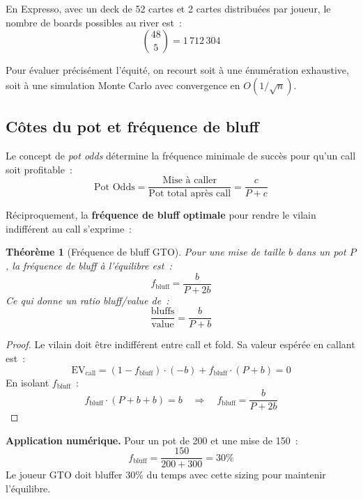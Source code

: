 \documentclass[a4paper,11pt]{article}
\newtheorem{theoreme}{Th\'eor\`eme}[section]
\newcommand{\EV}{\mathrm{EV}}
\begin{document}
En Expresso, avec un deck de 52 cartes et 2 cartes distribu\'ees par joueur, le nombre de boards possibles au river est~:
\begin{equation}
\binom{48}{5} = 1\,712\,304
\end{equation}

Pour \'evaluer pr\'ecis\'ement l'\'equit\'e, on recourt soit \`a une \'enum\'eration exhaustive, soit \`a une simulation Monte Carlo avec convergence en $O(1/\sqrt{n})$.

\subsection{C\^otes du pot et fr\'equence de bluff}

Le concept de \textit{pot odds} d\'etermine la fr\'equence minimale de succ\`es pour qu'un call soit profitable~:
\begin{equation}
\text{Pot Odds} = \frac{\text{Mise \`a caller}}{\text{Pot total apr\`es call}} = \frac{c}{P + c}
\end{equation}

R\'eciproquement, la \textbf{fr\'equence de bluff optimale} pour rendre le vilain indiff\'erent au call s'exprime~:

\begin{theoreme}[Fr\'equence de bluff GTO]
Pour une mise de taille $b$ dans un pot $P$, la fr\'equence de bluff \`a l'\'equilibre est~:
\begin{equation}
f_{\text{bluff}} = \frac{b}{P + 2b}
\label{eq:bluff_freq}
\end{equation}
Ce qui donne un ratio bluff/value de~:
\begin{equation}
\frac{\text{bluffs}}{\text{value}} = \frac{b}{P + b}
\end{equation}
\end{theoreme}

\begin{proof}
Le vilain doit \^etre indiff\'erent entre call et fold. Sa valeur esp\'er\'ee en callant est~:
\[
\EV_{\text{call}} = (1 - f_{\text{bluff}}) \cdot (-b) + f_{\text{bluff}} \cdot (P + b) = 0
\]
En isolant $f_{\text{bluff}}$~:
\[
f_{\text{bluff}} \cdot (P + b + b) = b \quad \Longrightarrow \quad f_{\text{bluff}} = \frac{b}{P + 2b}
\]
\end{proof}

\textbf{Application num\'erique.} Pour un pot de 200 et une mise de 150~:
\[
f_{\text{bluff}} = \frac{150}{200 + 300} = 30\%
\]
Le joueur GTO doit bluffer 30\% du temps avec cette sizing pour maintenir l'\'equilibre.
\end{document}
